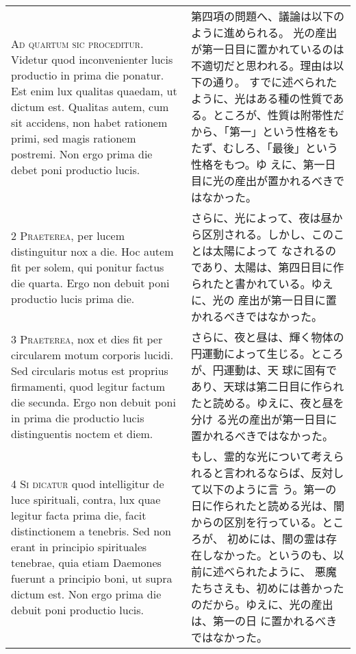 \documentclass[10pt]{jsarticle} %
\begin{document}
\begin{longtable}{p{21em}p{21em}}

{\huge A}{\scshape d quartum sic proceditur}. Videtur quod
inconvenienter lucis productio in prima die ponatur. Est enim lux
qualitas quaedam, ut dictum est. Qualitas autem, cum sit accidens, non
habet rationem primi, sed magis rationem postremi. Non ergo prima die
debet poni productio lucis.

&

第四項の問題へ、議論は以下のように進められる。
光の産出が第一日目に置かれているのは不適切だと思われる。理由は以下の通り。
すでに述べられたように、光はある種の性質である。ところが、性質は附帯性だ
 から、「第一」という性格をもたず、むしろ、「最後」という性格をもつ。ゆ
 えに、第一日目に光の産出が置かれるべきではなかった。

\\


{\scshape 2 Praeterea}, per lucem distinguitur nox a
die. Hoc autem fit per solem, qui ponitur factus die quarta. Ergo non
debuit poni productio lucis prima die.

&

さらに、光によって、夜は昼から区別される。しかし、このことは太陽によって
なされるのであり、太陽は、第四日目に作られたと書かれている。ゆえに、光の
 産出が第一日目に置かれるべきではなかった。

\\


{\scshape 3 Praeterea}, nox et dies fit per circularem
motum corporis lucidi. Sed circularis motus est proprius firmamenti,
quod legitur factum die secunda. Ergo non debuit poni in prima die
productio lucis distinguentis noctem et diem.

&
さらに、夜と昼は、輝く物体の円運動によって生じる。ところが、円運動は、天
 球に固有であり、天球は第二日目に作られたと読める。ゆえに、夜と昼を分け
 る光の産出が第一日目に置かれるべきではなかった。

\\


{\scshape 4 Si dicatur} quod intelligitur de luce
spirituali, contra, lux quae legitur facta prima die, facit
distinctionem a tenebris. Sed non erant in principio spirituales
tenebrae, quia etiam Daemones fuerunt a principio boni, ut supra dictum
est. Non ergo prima die debuit poni productio lucis.

&

もし、霊的な光について考えられると言われるならば、反対して以下のように言
 う。第一の日に作られたと読める光は、闇からの区別を行っている。ところが、
 初めには、闇の霊は存在しなかった。というのも、以前に述べられたように、
 悪魔たちさえも、初めには善かったのだから。ゆえに、光の産出は、第一の日
 に置かれるべきではなかった。


\end{longtable}
\end{document}
